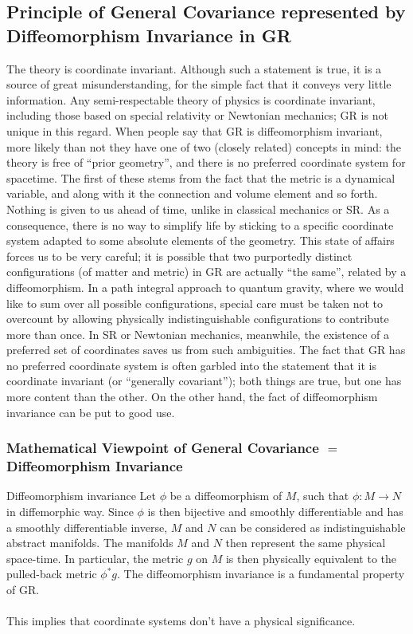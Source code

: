 \subsection{Principle of General Covariance represented by Diffeomorphism Invariance in GR}
The theory is coordinate invariant. Although such a statement
is true, it is a source of great misunderstanding, for the simple fact that it conveys very little
information. Any semi-respectable theory of physics is coordinate invariant, including those
based on special relativity or Newtonian mechanics; GR is not unique in this regard. When
people say that GR is diffeomorphism invariant, more likely than not they have one of two
(closely related) concepts in mind: the theory is free of “prior geometry”, and there is no
preferred coordinate system for spacetime. The first of these stems from the fact that the
metric is a dynamical variable, and along with it the connection and volume element and
so forth. Nothing is given to us ahead of time, unlike in classical mechanics or SR. As
a consequence, there is no way to simplify life by sticking to a specific coordinate system
adapted to some absolute elements of the geometry. This state of affairs forces us to be very
careful; it is possible that two purportedly distinct configurations (of matter and metric)
in GR are actually “the same”, related by a diffeomorphism. In a path integral approach
to quantum gravity, where we would like to sum over all possible configurations, special
care must be taken not to overcount by allowing physically indistinguishable configurations
to contribute more than once. In SR or Newtonian mechanics, meanwhile, the existence
of a preferred set of coordinates saves us from such ambiguities. The fact that GR has no
preferred coordinate system is often garbled into the statement that it is coordinate invariant
(or “generally covariant”); both things are true, but one has more content than the other.
On the other hand, the fact of diffeomorphism invariance can be put to good use. 
\subsubsection{Mathematical Viewpoint of General Covariance $=$ Diffeomorphism Invariance}

\begin{mybox}{Diffeomorphism invariance}
	Let $\phi$ be a diffeomorphism of $M$, such that $\phi:M\rightarrow N$ in diffemorphic way. Since $\phi$ is then bijective and smoothly differentiable and has a smoothly differentiable inverse, $M$ and $N$ can be considered as indistinguishable abstract manifolds. The manifolds $M$ and $N$ then represent the same physical space-time. In particular, the metric $g$ on $M$ is then physically equivalent to the pulled-back metric $\phi^* g$. The diffeomorphism invariance is a fundamental property of GR.\\
	\\
	This implies that coordinate systems don't have a physical significance.
\end{mybox}

